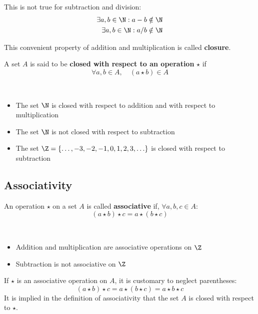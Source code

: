 This is not true for subtraction and division:
\begin{align*}
    \exists a,b \in \N : a - b &\notin \N \\
    \exists a,b \in \N : a/b &\notin \N
\end{align*}

This convenient property of addition and multiplication is called \textbf{closure}.

\begin{definition}[Closure]\label{def:closure}
    A set $A$ is said to be \textbf{closed with respect to an operation} $\star$ if
    \[
        \forall a,b \in A, \quad (a \star b) \in A
    \]
\end{definition}

\begin{eg}\ 
    \begin{itemize}
        \item The set $\N$ is closed with respect to addition and with respect to multiplication
        \item The set $\N$ is not closed with respect to subtraction
        \item The set $\Z = \{\ldots, -3, -2, -1, 0, 1, 2, 3, \ldots\}$ is closed with respect to subtraction
    \end{itemize}
\end{eg}

\subsection{Associativity}

\begin{definition}\label{def:associativity}
    An operation $\star$ on a set $A$ is called \textbf{associative} if, $\forall a,b,c \in A$:
    \[
        (a \star b) \star c = a \star (b \star c)
    \]
\end{definition}

\begin{eg}\ 
    \begin{itemize}
        \item Addition and multiplication are associative operations on $\Z$
        \item Subtraction is not associative on $\Z$
    \end{itemize}
\end{eg}

\begin{note} If $\star$ is an associative operation on $A$, it is customary to neglect parentheses:
        \[
            (a \star b) \star c = a \star (b \star c) = a \star b \star c
        \]
        It is implied in the definition of associativity that the set $A$ is closed with respect to $\star$.
\end{note}

